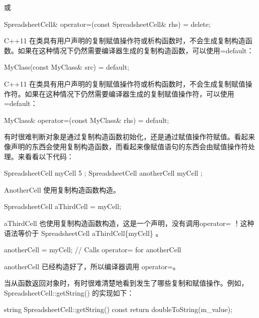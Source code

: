或

\begin{cpp}
SpreadsheetCell& operator=(const SpreadsheetCell& rhs) = delete;
\end{cpp}


C++11 在类具有用户声明的复制赋值操作符或析构函数时，不会生成复制构造函数。如果在这种情况下仍然需要编译器生成的复制构造函数，可以使用=default：

\begin{cpp}
MyClass(const MyClass& src) = default;
\end{cpp}

C++11 在类具有用户声明的复制赋值操作符或析构函数时，不会生成复制赋值操作符。如果在这种情况下仍然需要编译器生成的复制赋值操作符，可以使用=default：

\begin{cpp}
MyClass& operator=(const MyClass& rhs) = default;
\end{cpp}


有时很难判断对象是通过复制构造函数初始化，还是通过赋值操作符赋值。看起来像声明的东西会使用复制构造函数，而看起来像赋值语句的东西会由赋值操作符处理。来看看以下代码：

\begin{cpp}
SpreadsheetCell myCell { 5 };
SpreadsheetCell anotherCell { myCell };
\end{cpp}

AnotherCell 使用复制构造函数构造。

\begin{cpp}
SpreadsheetCell aThirdCell = myCell;
\end{cpp}

aThirdCell 也使用复制构造函数构造，这是一个声明，没有调用operator= ！这种语法等价于 SpreadsheetCell aThirdCell\{myCell\} 。

\begin{cpp}
anotherCell = myCell; // Calls operator= for anotherCell
\end{cpp}

anotherCell 已经构造好了，所以编译器调用 operator=。


当从函数返回对象时，有时很难清楚地看到发生了哪些复制和赋值操作。例如，SpreadsheetCell::getString() 的实现如下：

\begin{cpp}
string SpreadsheetCell::getString() const
{
    return doubleToString(m_value);
}
\end{cpp}

